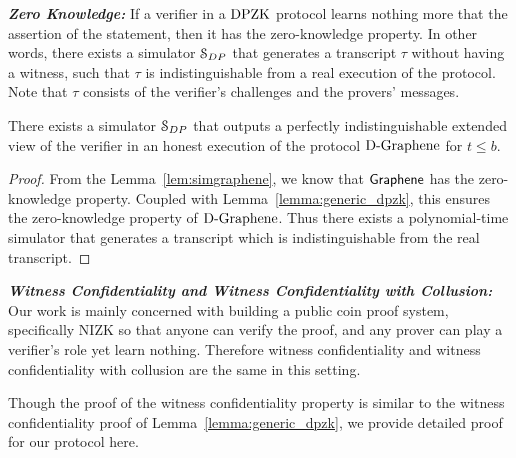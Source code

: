 \noindent\textit{\textbf{Zero Knowledge:}}
If a verifier in a $\text{DPZK}$ protocol learns nothing more that the assertion of the statement, then it has the zero-knowledge property.
In other words, there exists a simulator $\mathcal{S}_{DP}$ that generates a transcript $\tau$ without having a witness, such that $\tau$ is indistinguishable from a real execution of the protocol. Note that $\tau$ consists of the verifier's challenges and the provers' messages. 

\begin{lemma}\label{lem:simdpgraphene}
	There exists a simulator $\mathcal{S}_{DP}$ that outputs a perfectly indistinguishable extended view of the verifier in an honest execution of the protocol $\text{D-Graphene}$ for $t\leq b$.
\end{lemma}
\begin{proof}
From the Lemma~\ref{lem:simgraphene}, we know that $\textsf{Graphene}$ has the zero-knowledge property. Coupled with Lemma~\ref{lemma:generic_dpzk}, this ensures the zero-knowledge property of $\text{D-Graphene}$. Thus there exists a polynomial-time simulator that generates a transcript which is indistinguishable from the real transcript.
\end{proof}

\noindent\textit{\textbf{Witness Confidentiality and Witness Confidentiality with Collusion:}} Our work is mainly concerned with building a public coin proof system, specifically NIZK so that anyone can verify the proof, and any prover can play a verifier's role yet learn nothing. Therefore witness confidentiality and witness confidentiality with collusion are the same in this setting.

Though the proof of the witness confidentiality property is similar to the witness confidentiality proof of Lemma~\ref{lemma:generic_dpzk}, we provide detailed proof for our protocol here.

